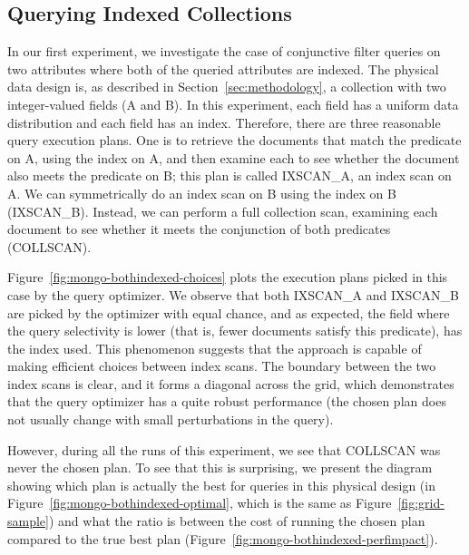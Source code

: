 \subsection{Querying Indexed Collections}
\label{sec:evaluation_bothindexed}
In our first experiment, we investigate the case of conjunctive filter queries on two attributes where both of the queried attributes are indexed. The physical data design is, as described in Section~\ref{sec:methodology}, a collection with two integer-valued fields (A and B). In this experiment, each field has a uniform data distribution and each field has an index. Therefore, there are three reasonable query execution plans. One is to retrieve the documents that match the predicate on A, using the index on A, and then examine each to see whether the document also meets the predicate on B; this plan is called IXSCAN\_A, an index scan on A. We can symmetrically do an index scan on B using the index on B (IXSCAN\_B). Instead, we can perform a full collection scan, examining each document to see whether it meets the conjunction of both predicates (COLLSCAN). %


Figure~\ref{fig:mongo-bothindexed-choices} plots the execution plans picked in this case by the \relname query optimizer. We observe that both IXSCAN\_A  and IXSCAN\_B are picked by the optimizer with equal chance, and as expected, the field where the query selectivity is lower (that is, fewer documents satisfy this predicate), has the index used.  This phenomenon suggests that the \approachName approach is capable of making efficient choices between index scans. The boundary between the two index scans is clear, and it forms a diagonal across the grid, which demonstrates that the query optimizer has a quite robust performance (the chosen plan does not usually change with small perturbations in the query). 

However, during all the runs of this experiment, we see that COLLSCAN was never the chosen plan. To see that this is surprising, we present the diagram showing which plan is actually the best for queries in this physical design (in Figure~\ref{fig:mongo-bothindexed-optimal}, which is the same as Figure~\ref{fig:grid-sample}) and what the ratio is between the cost of running the chosen plan compared to the true best plan (Figure~\ref{fig:mongo-bothindexed-perfimpact}). 

